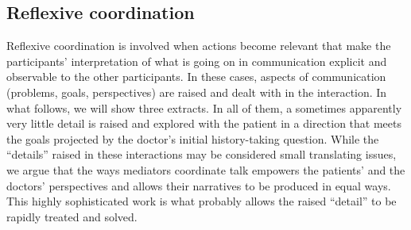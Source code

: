\documentclass[output=paper]{LSP/langsci}
\begin{document}
\subsection{Reflexive coordination} 

Reflexive coordination is involved when actions become relevant that make the participants' interpretation of what is going on in communication explicit and observable to the other participants. In these cases, aspects of communication (problems, goals, perspectives) are raised and dealt with in the interaction. In what follows, we will show three extracts. In all of them, a sometimes apparently very little detail is raised and explored with the patient in a direction that meets the goals projected by the doctor's initial history-taking question. While the ``details'' raised in these interactions may be considered small translating issues, we argue that the ways mediators coordinate talk empowers the patients' and the doctors' perspectives and allows their narratives to be produced in equal ways. This highly sophisticated work is what probably allows the raised ``detail'' to be rapidly treated and solved. 
\end{document}

